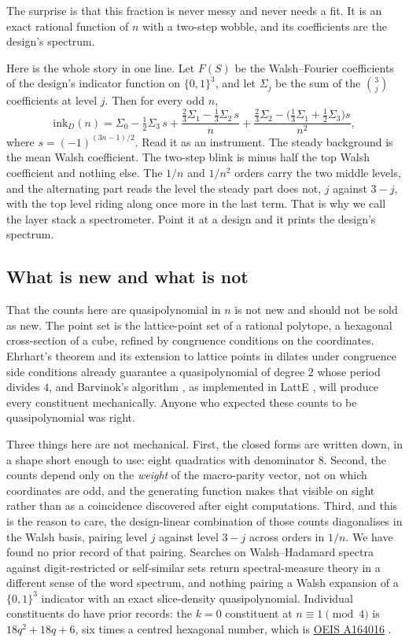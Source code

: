 \documentclass[11pt]{amsart}
\theoremstyle{definition}
\theoremstyle{remark}
\begin{document}
The surprise is that this fraction is never messy and never needs a fit. It is an exact rational function of $n$ with a two-step wobble, and its coefficients are the design's spectrum.


Here is the whole story in one line. Let $F(S)$ be the Walsh--Fourier coefficients of the design's indicator function on $\{0,1\}^3$, and let $\Sigma_j$ be the sum of the $\binom{3}{j}$ coefficients at level $j$. Then for every odd $n$,
\[
\mathrm{ink}_D(n) = \Sigma_0 - \tfrac12 \Sigma_3\, s
 + \frac{\tfrac23 \Sigma_1 - \tfrac13 \Sigma_2\, s}{n}
 + \frac{\tfrac23 \Sigma_2 - \bigl(\tfrac13 \Sigma_1 + \tfrac12 \Sigma_3\bigr) s}{n^2},
\]
where $s = (-1)^{(3n-1)/2}$. Read it as an instrument. The steady background is the mean Walsh coefficient. The two-step blink is minus half the top Walsh coefficient and nothing else. The $1/n$ and $1/n^2$ orders carry the two middle levels, and the alternating part reads the level the steady part does not, $j$ against $3-j$, with the top level riding along once more in the last term. That is why we call the layer stack a spectrometer. Point it at a design and it prints the design's spectrum.

\subsection*{What is new and what is not}

That the counts here are quasipolynomial in $n$ is not new and should not be sold as new. The point set is the lattice-point set of a rational polytope, a hexagonal cross-section of a cube, refined by congruence conditions on the coordinates. Ehrhart's theorem and its extension to lattice points in dilates under congruence side conditions \cite{ehrhart,beckrobins} already guarantee a quasipolynomial of degree $2$ whose period divides $4$, and Barvinok's algorithm \cite{barvinok}, as implemented in LattE \cite{latte}, will produce every constituent mechanically. Anyone who expected these counts to be quasipolynomial was right.

Three things here are not mechanical. First, the closed forms are written down, in a shape short enough to use: eight quadratics with denominator $8$. Second, the counts depend only on the \emph{weight} of the macro-parity vector, not on which coordinates are odd, and the generating function makes that visible on sight rather than as a coincidence discovered after eight computations. Third, and this is the reason to care, the design-linear combination of those counts diagonalises in the Walsh basis, pairing level $j$ against level $3-j$ across orders in $1/n$. We have found no prior record of that pairing. Searches on Walsh--Hadamard spectra against digit-restricted or self-similar sets return spectral-measure theory in a different sense of the word spectrum, and nothing pairing a Walsh expansion of a $\{0,1\}^3$ indicator with an exact slice-density quasipolynomial. Individual constituents do have prior records: the $k=0$ constituent at $n \equiv 1 \pmod 4$ is $18q^2+18q+6$, six times a centred hexagonal number, which is \href{https://oeis.org/A164016}{OEIS A164016} \cite{oeisA164016,oeisA003215}.
\end{document}
